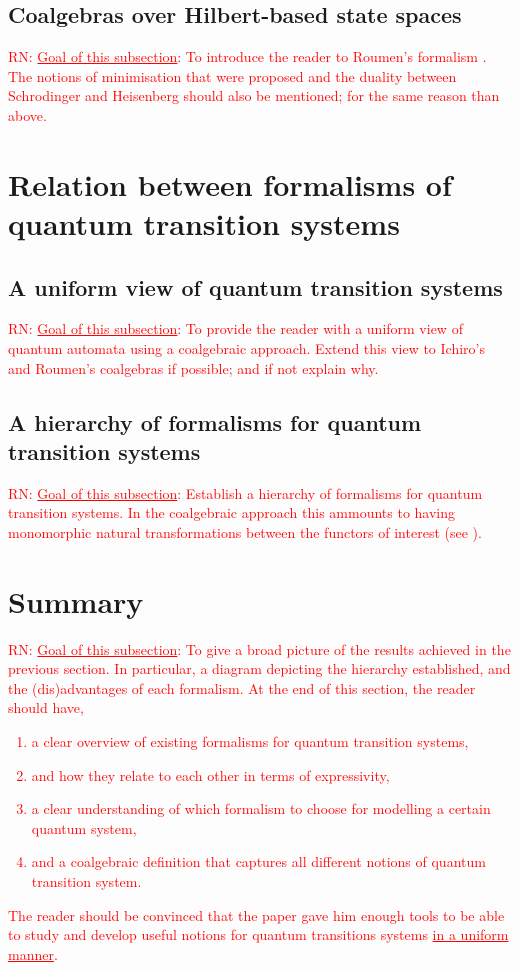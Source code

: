 \documentclass[a4paper, 11pt]{article}
\newcommand{\nevComment}[1]{\textcolor{red}{RN: #1}}
\begin{document}
\subsection{Coalgebras over Hilbert-based state spaces}

\nevComment{\underline{Goal of this subsection}: To introduce the
  reader to Roumen's formalism \cite{F14}. The notions of minimisation
  that were proposed and the duality between Schrodinger and Heisenberg should
  also be mentioned; for the same reason than above.}


\section{Relation between formalisms of quantum transition systems}

\subsection{A uniform view of quantum transition systems}

\nevComment{\underline{Goal of this subsection}: To provide the reader with a uniform
view of quantum automata \cite{hirvensalo11} using a coalgebraic approach. Extend this
view to Ichiro's and Roumen's coalgebras if possible; and if not explain why.}

\subsection{A hierarchy of formalisms for quantum transition systems}

\nevComment{\underline{Goal of this subsection}: Establish a hierarchy
  of formalisms for quantum transition systems. In the coalgebraic
  approach this ammounts to having monomorphic natural transformations
  between the functors of interest (see \cite[Section 4.4]{sokolova}).
}

\section{Summary}

\nevComment{\underline{Goal of this subsection}: To give a broad
  picture of the results achieved in the previous section. In
  particular, a diagram depicting the hierarchy established, and the
  (dis)advantages of each formalism. At the end of this section, the
  reader should have,
  \begin{enumerate}
  \item a clear overview of existing formalisms for quantum transition systems,
  \item and how they relate to each other in terms of expressivity,
  \item a clear understanding of which formalism to choose for modelling a certain quantum
    system,
  \item and a coalgebraic definition that captures all different
    notions of quantum transition system.
  \end{enumerate}
  The reader should be convinced that the paper gave him enough tools to be able to study and develop
  useful notions for quantum transitions systems \underline{in a uniform manner}. 
}
\end{document}
